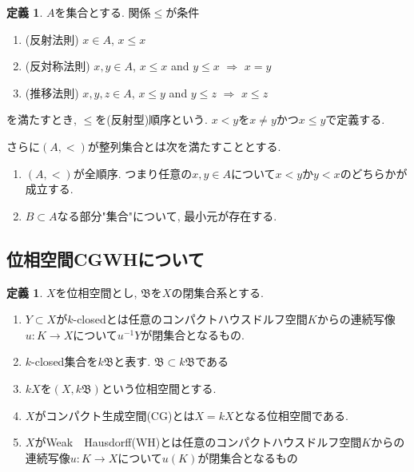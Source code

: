 \documentclass[dvipdfmx,a4paper,11pt]{article}
\theoremstyle{definition}
\newtheorem{dfn}[thm]{定義}
\begin{document}
\begin{tcolorbox}[colback = white, colframe = green!35!black, fonttitle = \bfseries,breakable = true]
 \begin{dfn}
 $A$を集合とする. 関係$\le$が条件
 \begin{enumerate}
 \item (反射法則) $x \in A$, $x \le x$
 \item (反対称法則) $x,y \in A$, $x \le x$ and $y \le x$ $\Rightarrow$ $x=y$
 \item (推移法則) $x,y, z\in A$, $x \le y$ and $y \le z$ $\Rightarrow$ $x\le z$
 \end{enumerate}
を満たすとき, $\le$を(反射型)順序という.
$x< y$を$x \neq y$かつ$x \le y$で定義する. 

さらに$(A,<)$が整列集合とは次を満たすこととする. 
 \begin{enumerate}
 \item  $(A,<)$が全順序. つまり任意の$x, y \in A$について$x <y$か$y < x$のどちらかが成立する.
 \item $B \subset A$なる部分"集合"について, 最小元が存在する. 
 \end{enumerate}
\end{dfn}
 \end{tcolorbox}

\subsection{位相空間CGWHについて}
\label{subsec-CGWH}
\begin{tcolorbox}
 [colback = white, colframe = green!35!black, fonttitle = \bfseries,breakable = true]
\begin{dfn}\cite[Definition 1.1 ,1.2]{Str}
$X$を位相空間とし, $\mathfrak{B}$を$X$の閉集合系とする. 
\begin{enumerate}
\item $Y \subset X$が$k$-closedとは任意のコンパクトハウスドルフ空間$K$からの連続写像$u : K \to X$について$u^{-1}Y$が閉集合となるもの. 
\item $k$-closed集合を$k\mathfrak{B}$と表す. $\mathfrak{B} \subset k \mathfrak{B}$である
\item $kX$を$(X, k\mathfrak{B})$という位相空間とする. 
\item $X$がコンパクト生成空間(CG)とは$X = kX$となる位相空間である.
\item $X$がWeak　Hausdorff(WH)とは任意のコンパクトハウスドルフ空間$K$からの連続写像$u : K \to X$について$u(K)$が閉集合となるもの
\end{enumerate}
\end{dfn}
\end{tcolorbox}
\end{document}
